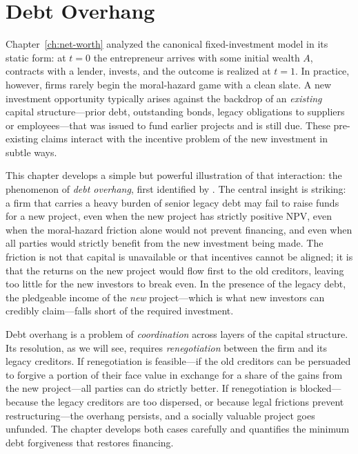 \documentclass[11pt,a4paper,oneside]{book}
\theoremstyle{plain}
\theoremstyle{definition}
\theoremstyle{remark}
\numberwithin{equation}{chapter}
\begin{document}
\chapter{Debt Overhang}
\label{ch:debt-overhang}

Chapter~\ref{ch:net-worth} analyzed the canonical fixed-investment model in its static form: at $t=0$ the entrepreneur arrives with some initial wealth $A$, contracts with a lender, invests, and the outcome is realized at $t=1$.
In practice, however, firms rarely begin the moral-hazard game with a clean slate.
A new investment opportunity typically arises against the backdrop of an \emph{existing} capital structure---prior debt, outstanding bonds, legacy obligations to suppliers or employees---that was issued to fund earlier projects and is still due.
These pre-existing claims interact with the incentive problem of the new investment in subtle ways.

This chapter develops a simple but powerful illustration of that interaction: the phenomenon of \emph{debt overhang}, first identified by \citet{Myers1977}.
The central insight is striking: a firm that carries a heavy burden of senior legacy debt may fail to raise funds for a new project, even when the new project has strictly positive NPV, even when the moral-hazard friction alone would not prevent financing, and even when all parties would strictly benefit from the new investment being made.
The friction is not that capital is unavailable or that incentives cannot be aligned; it is that the returns on the new project would flow first to the old creditors, leaving too little for the new investors to break even.
In the presence of the legacy debt, the pledgeable income of the \emph{new} project---which is what new investors can credibly claim---falls short of the required investment.

Debt overhang is a problem of \emph{coordination} across layers of the capital structure.
Its resolution, as we will see, requires \emph{renegotiation} between the firm and its legacy creditors.
If renegotiation is feasible---if the old creditors can be persuaded to forgive a portion of their face value in exchange for a share of the gains from the new project---all parties can do strictly better.
If renegotiation is blocked---because the legacy creditors are too dispersed, or because legal frictions prevent restructuring---the overhang persists, and a socially valuable project goes unfunded.
The chapter develops both cases carefully and quantifies the minimum debt forgiveness that restores financing.
\end{document}
